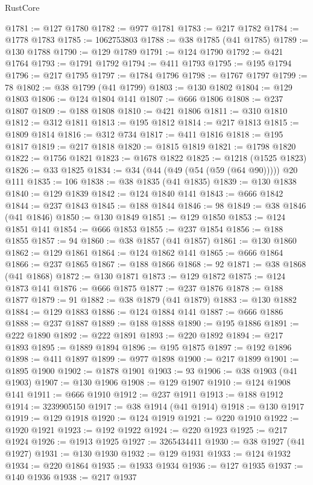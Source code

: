 \begin{lexlean}{RustCore}
\begin{coremodule}
@1781 := @127 @1780
@1782 := @977 @1781
@1783 := @217 @1782
@1784 := @1778 @1783
@1785 := 1062753803
@1788 := @38 @1785 (@41 @1785)
@1789 := @130 @1788
@1790 := @129 @1789
@1791 := @124 @1790
@1792 := @421 @1764
@1793 := @1791 @1792
@1794 := @411 @1793
@1795 := @195 @1794
@1796 := @217 @1795
@1797 := @1784 @1796
@1798 := @1767 @1797
@1799 := 78
@1802 := @38 @1799 (@41 @1799)
@1803 := @130 @1802
@1804 := @129 @1803
@1806 := @124 @1804 @141
@1807 := @666 @1806
@1808 := @237 @1807
@1809 := @188 @1808
@1810 := @421 @1806
@1811 := @310 @1810
@1812 := @312 @1811
@1813 := @195 @1812
@1814 := @217 @1813
@1815 := @1809 @1814
@1816 := @312 @734
@1817 := @411 @1816
@1818 := @195 @1817
@1819 := @217 @1818
@1820 := @1815 @1819
@1821 := @1798 @1820
@1822 := @1756 @1821
@1823 := @1678 @1822
@1825 := @1218 (@1525 @1823)
@1826 := @33 @1825
@1834 := @34 (@44 (@49 (@54 (@59 (@64 @90))))) @20 @111
@1835 := 106
@1838 := @38 @1835 (@41 @1835)
@1839 := @130 @1838
@1840 := @129 @1839
@1842 := @124 @1840 @141
@1843 := @666 @1842
@1844 := @237 @1843
@1845 := @188 @1844
@1846 := 98
@1849 := @38 @1846 (@41 @1846)
@1850 := @130 @1849
@1851 := @129 @1850
@1853 := @124 @1851 @141
@1854 := @666 @1853
@1855 := @237 @1854
@1856 := @188 @1855
@1857 := 94
@1860 := @38 @1857 (@41 @1857)
@1861 := @130 @1860
@1862 := @129 @1861
@1864 := @124 @1862 @141
@1865 := @666 @1864
@1866 := @237 @1865
@1867 := @188 @1866
@1868 := 92
@1871 := @38 @1868 (@41 @1868)
@1872 := @130 @1871
@1873 := @129 @1872
@1875 := @124 @1873 @141
@1876 := @666 @1875
@1877 := @237 @1876
@1878 := @188 @1877
@1879 := 91
@1882 := @38 @1879 (@41 @1879)
@1883 := @130 @1882
@1884 := @129 @1883
@1886 := @124 @1884 @141
@1887 := @666 @1886
@1888 := @237 @1887
@1889 := @188 @1888
@1890 := @195 @1886
@1891 := @222 @1890
@1892 := @222 @1891
@1893 := @220 @1892
@1894 := @217 @1893
@1895 := @1889 @1894
@1896 := @195 @1875
@1897 := @192 @1896
@1898 := @411 @1897
@1899 := @977 @1898
@1900 := @217 @1899
@1901 := @1895 @1900
@1902 := @1878 @1901
@1903 := 93
@1906 := @38 @1903 (@41 @1903)
@1907 := @130 @1906
@1908 := @129 @1907
@1910 := @124 @1908 @141
@1911 := @666 @1910
@1912 := @237 @1911
@1913 := @188 @1912
@1914 := 3239905150
@1917 := @38 @1914 (@41 @1914)
@1918 := @130 @1917
@1919 := @129 @1918
@1920 := @124 @1919
@1921 := @220 @1910
@1922 := @1920 @1921
@1923 := @192 @1922
@1924 := @220 @1923
@1925 := @217 @1924
@1926 := @1913 @1925
@1927 := 3265434411
@1930 := @38 @1927 (@41 @1927)
@1931 := @130 @1930
@1932 := @129 @1931
@1933 := @124 @1932
@1934 := @220 @1864
@1935 := @1933 @1934
@1936 := @127 @1935
@1937 := @140 @1936
@1938 := @217 @1937

\end{coremodule}
\end{lexlean}
